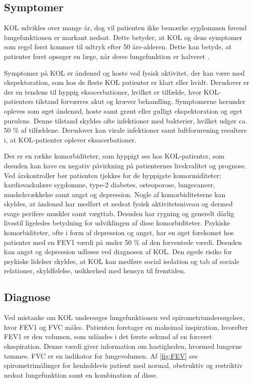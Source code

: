 \subsection{Symptomer}
KOL udvikles over mange år, dog vil patienten ikke bemærke sygdommen førend lungefunktionen er markant nedsat. Dette betyder, at KOL og dens symptomer som regel først kommer til udtryk efter 50 års-alderen\cite{Lange2015}. Dette kan betyde, at patienter først opsøger en læge, når deres lungefunktion er halveret \cite{dsam2016}.

Symptomer på KOL er åndenød og hoste ved fysisk aktivitet, der kan være med ekspektoration, som hos de fleste KOL patienter er klart eller hvidt.\cite{Basisbogen2016} Derudover er der en tendens til hyppig eksacerbationer, hvilket er tilfælde, hvor KOL-patienters tilstand forværres akut og kræver behandling. 
Symptomerne herunder opleves som øget åndenød, hoste samt grønt eller gulligt ekspektoration og øget purulens. Denne tilstand skyldes ofte infektioner med bakterier, hvilket udgør ca. 50 \% af tilfældene. Derudover kan virale infektioner samt luftforurening resultere i, at KOL-patienter oplever eksacerbationer.\cite{Basisbogen2016, dsam2016} 

Der er en række komorbiditeter, som hyppigt ses hos KOL-patienter, som desuden kan have en negativ påvirkning på patienternes livskvalitet og prognose. Ved årskontroller bør patienten tjekkes for de hyppigste komormiditeter; kardiovaskulære sygdomme, type-2 diabetes, osteoporose, lungecancer, muskelsvækkelse samt angst og depression.
Nogle af komorbiditeterne kan skyldes, at åndenød har medført et nedsat fysisk aktivitetsniveau og dermed svage perifere muskler samt vægttab. Desuden har rygning og generelt dårlig livsstil ligeledes betydning for udviklingen af disse komorbiditeter. \cite{dsam2016, McCarthy2015}
Psykiske komorbiditeter, ofte i form af depression og angst, har en øget forekomst hos patienter med en FEV1 værdi på under 50 \% af den forventede værdi. Desuden kan angst og depression udløses ved diagnosen af KOL. Den øgede risiko for psykiske lidelser skyldes, at KOL kan medføre social isolation og tab af sociale relationer, skyldfølelse, usikkerhed med hensyn til fremtiden. \cite{dsam2016}


\subsection{Diagnose}
Ved mistanke om KOL undersøges lungefunktionen ved spirometriundersøgelser, hvor FEV1 og FVC måles. Patienten foretager en maksimal inspiration, hvorefter FEV1 er den volumen, som udåndes i det første sekund af en forceret eksspiration. Denne værdi giver information om hastigheden, hvormed lungerne tømmes. FVC er en indikator for lungevolumen. Af \autoref{fig:FEV} ses spirometrimålinger for henholdsvis patient med normal, obstruktiv og restriktiv nedsat lungefunktion samt en kombination af disse.\cite{Basisbogen2016, Sundhed2013}

